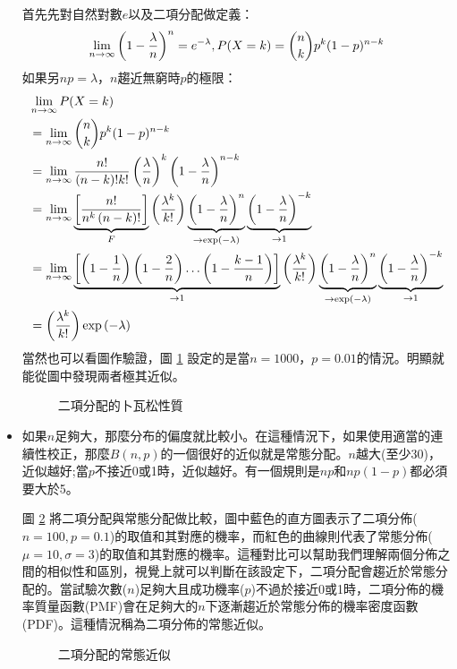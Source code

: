 \begin{itemize}
首先先對自然對數$e$以及二項分配做定義：
$$\lim_{n\to\infty}\left(1-{\lambda \over n}\right)^n=e^{-\lambda},{\displaystyle P(X=k)={n \choose k}p^{k}(1-p)^{n-k}}$$
如果另$np = \lambda $，$n$趨近無窮時$p$的極限：
\begin{align*}
&\lim_{n\to\infty} P(X=k)\\
&=\lim_{n\to\infty}{n \choose k} p^k (1-p)^{n-k} \\
 &=\lim_{n\to\infty}{n! \over (n-k)!k!} \left({\lambda \over n}\right)^k \left(1-{\lambda\over n}\right)^{n-k}\\
&=\lim_{n\to\infty}
\underbrace{\left[\frac{n!}{n^k\left(n-k\right)!}\right]}_F
\left(\frac{\lambda^k}{k!}\right)
\underbrace{\left(1-\frac{\lambda}{n}\right)^n}_{\to\exp\left(-\lambda\right)}
\underbrace{\left(1-\frac{\lambda}{n}\right)^{-k}}_{\to 1} \\
&= \lim_{n\to\infty}
\underbrace{\left[ \left(1-\frac{1}{n}\right)\left(1-\frac{2}{n}\right) \ldots \left(1-\frac{k-1}{n}\right)  \right]}_{\to 1}
\left(\frac{\lambda^k}{k!}\right)
\underbrace{\left(1-\frac{\lambda}{n}\right)^n}_{\to\exp\left(-\lambda\right)}
\underbrace{\left(1-\frac{\lambda}{n}\right)^{-k}}_{\to 1}      \\
&= \left(\frac{\lambda^k}{k!}\right)\exp\left(-\lambda\right)
\end{align*}
當然也可以看圖作驗證，圖 \ref{fig:binomial_poisson} 設定的是當$n=1000$，$p=0.01$的情況。明顯就能從圖中發現兩者極其近似。
\begin{figure}[H]
    \caption{二項分配的卜瓦松性質}
    \label{fig:binomial_poisson}
\end{figure}

\item 如果$n$足夠大，那麼分布的偏度就比較小。在這種情況下，如果使用適當的連續性校正，那麼$B(n,p)$的一個很好的近似就是常態分配。$n$越大(至少30)，近似越好;當$p$不接近0或1時，近似越好。有一個規則是$np$和$np(1-p)$都必須要大於5。

圖 \ref{fig:binomial_normal} 將二項分配與常態分配做比較，圖中藍色的直方圖表示了二項分佈($n=100,p=0.1$)的取值和其對應的機率，而紅色的曲線則代表了常態分佈($\mu=10,\sigma=3$)的取值和其對應的機率。這種對比可以幫助我們理解兩個分佈之間的相似性和區別，視覺上就可以判斷在該設定下，二項分配會趨近於常態分配的。當試驗次數($n$)足夠大且成功機率($p$)不過於接近0或1時，二項分佈的機率質量函數(PMF)會在足夠大的$n$下逐漸趨近於常態分佈的機率密度函數(PDF)。這種情況稱為二項分佈的常態近似。
\begin{figure}[H]
    \caption{二項分配的常態近似}
    \label{fig:binomial_normal}
\end{figure}
\end{itemize}
